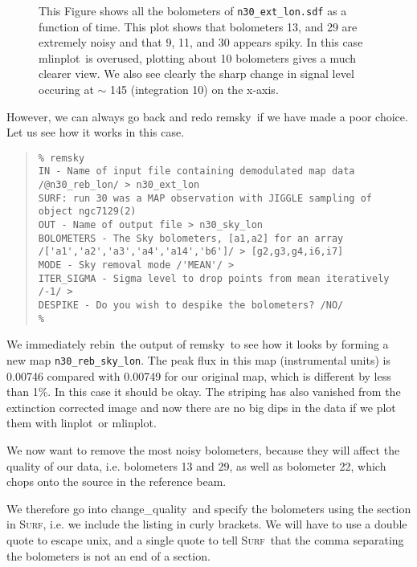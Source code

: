 \documentclass[twoside,11pt]{article}
\newenvironment{myquote}{\begin{quote}\begin{small}}{\end{small}\end{quote}}
\newcommand{\surf}{\xref{\textsc{Surf}}{sun216}{}}
\newcommand{\task}[1]{\textsf{#1}}
\newcommand{\rebin}{\xref{\task{rebin}}{sun216}{REBIN}}
\newcommand{\chgqual}{\xref{\task{change\_\-qua\-lity}}{sun216}{CHANGE_QUALITY}}
\newcommand{\remsky}{\xref{\task{remsky}}{sun216}{REMSKY}}
\newcommand{\linplot}{\xref{\task{linplot}}{sun95}{LINPLOT}}
\newcommand{\mlinplot}{\xref{\task{mlinplot}}{sun95}{MLINPLOT}}
\newcommand{\xref}[3]{#1}
\begin{document}
\begin{figure}
\begin{center}
\caption{This Figure shows all the bolometers of \texttt{n30\_ext\_lon.sdf} as a
function of time. This plot shows that bolometers 13, and 29 are extremely
noisy and that 9, 11, and 30 appears spiky. In this case \mlinplot\ is
overused, plotting about 10 bolometers gives a much clearer view. We also see
clearly the sharp change in signal level occuring at $\sim$ 145 (integration
10) on the x-axis.  }
\label{fig:mlineplots}
\end{center}
\end{figure}



However, we can always go back and redo \remsky\ if we have made a poor
choice. Let us see how it works in this case.

\begin{myquote} \begin{verbatim}
% remsky
IN - Name of input file containing demodulated map data
/@n30_reb_lon/ > n30_ext_lon
SURF: run 30 was a MAP observation with JIGGLE sampling of object ngc7129(2)
OUT - Name of output file > n30_sky_lon
BOLOMETERS - The Sky bolometers, [a1,a2] for an array
/['a1','a2','a3','a4','a14','b6']/ > [g2,g3,g4,i6,i7]
MODE - Sky removal mode /'MEAN'/ > 
ITER_SIGMA - Sigma level to drop points from mean iteratively /-1/ > 
DESPIKE - Do you wish to despike the bolometers? /NO/ 
% 
\end{verbatim} \end{myquote}

We immediately \rebin\ the output of \remsky\ to see how it looks by forming a
new map \texttt{n30\_\-reb\_\-sky\_\-lon}. The peak flux in this map
(instrumental units) is 0.00746 compared with 0.00749 for our original map,
which is different by less than 1\%. In this case it should be okay. The
striping has also vanished from the extinction corrected image and now there
are no big dips in the data if we plot them with \linplot\ or \mlinplot.

We now want to remove the most noisy bolometers, because they will affect
the quality of our data, i.e. bolometers 13  and 29, as well as bolometer
22, which chops onto the source in the reference beam.

We therefore go into \chgqual\ and specify the bolometers using
the section in \surf, i.e. we include the listing in curly brackets. 
We will have to use a double quote to escape unix, and a single
quote to tell \surf\ that the comma separating the bolometers is not an
end of a section.
\end{document}
